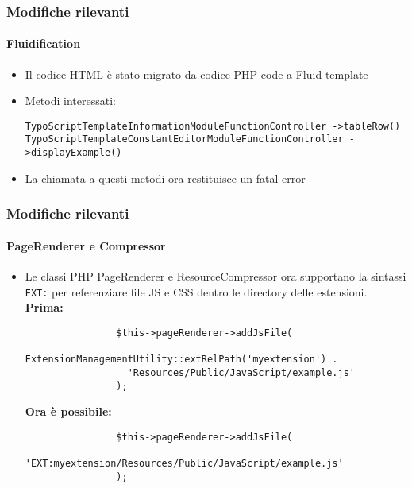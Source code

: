\begin{frame}[fragile]
	\frametitle{Modifiche rilevanti}
	\framesubtitle{Fluidification}

	\begin{itemize}
		\item Il codice HTML è stato migrato da codice PHP code a Fluid template
		\item Metodi interessati:\newline

			\smaller\texttt{TypoScriptTemplateInformationModuleFunctionController\newline
				->tableRow()}\normalsize\newline
			\smaller\texttt{TypoScriptTemplateConstantEditorModuleFunctionController\newline
				->displayExample()}\normalsize

		\item La chiamata a questi metodi ora restituisce un fatal error

	\end{itemize}

\end{frame}


\begin{frame}[fragile]
	\frametitle{Modifiche rilevanti}
	\framesubtitle{PageRenderer e Compressor}

	\lstset{basicstyle=\smaller\ttfamily}

	\begin{itemize}

		\item Le classi PHP PageRenderer e ResourceCompressor ora supportano la sintassi
			\texttt{EXT:} per referenziare file JS e CSS dentro le directory delle estensioni.\newline
			\textbf{Prima:}

			\begin{lstlisting}
				$this->pageRenderer->addJsFile(
				  ExtensionManagementUtility::extRelPath('myextension') .
				  'Resources/Public/JavaScript/example.js'
				);
			\end{lstlisting}

			\textbf{Ora è possibile:}

			\begin{lstlisting}
				$this->pageRenderer->addJsFile(
				  'EXT:myextension/Resources/Public/JavaScript/example.js'
				);
			\end{lstlisting}

	\end{itemize}

\end{frame}

